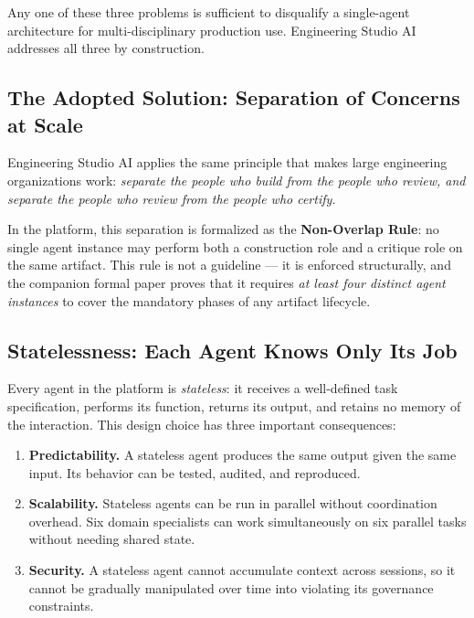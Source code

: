 \documentclass[12pt]{article}
\begin{document}
Any one of these three problems is sufficient to disqualify a
single-agent architecture for multi-disciplinary production use.
Engineering Studio AI addresses all three by construction.

\subsection{The Adopted Solution: Separation of Concerns at Scale}

Engineering Studio AI applies the same principle that makes large
engineering organizations work:
\emph{separate the people who build from the people who review,
and separate the people who review from the people who certify.}

In the platform, this separation is formalized as the
\textbf{Non-Overlap Rule}: no single agent instance may perform both
a construction role and a critique role on the same artifact.
This rule is not a guideline --- it is enforced structurally, and the
companion formal paper proves that it requires \emph{at least four
distinct agent instances} to cover the mandatory phases of any
artifact lifecycle.

\subsection{Statelessness: Each Agent Knows Only Its Job}

Every agent in the platform is \emph{stateless}: it receives a
well-defined task specification, performs its function, returns its
output, and retains no memory of the interaction.
This design choice has three important consequences:

\begin{enumerate}
    \item \textbf{Predictability.}
          A stateless agent produces the same output given the same
          input.  Its behavior can be tested, audited, and reproduced.

    \item \textbf{Scalability.}
          Stateless agents can be run in parallel without coordination
          overhead.  Six domain specialists can work simultaneously on
          six parallel tasks without needing shared state.

    \item \textbf{Security.}
          A stateless agent cannot accumulate context across sessions,
          so it cannot be gradually manipulated over time into
          violating its governance constraints.
\end{enumerate}
\end{document}
